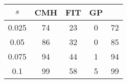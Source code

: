 \centering \begin{tabular}{c|c|c|c|c}
$s$	&CMH	&FIT	&GP	&\sc{Clear}\\\hline
0.025	&74	&23	&0	&72\\
0.05	&86	&32	&0	&85\\
0.075	&94	&44	&1	&94\\
0.1	&99	&58	&5	&99\\
\end{tabular}
